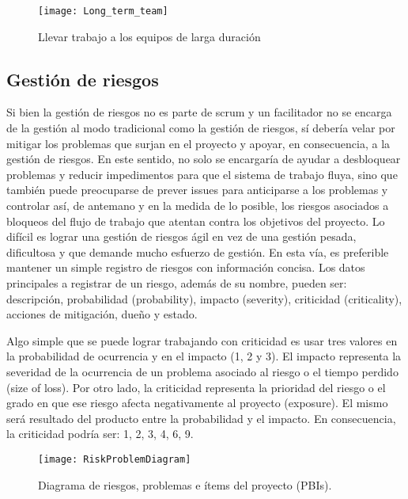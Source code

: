 \begin{figure}[h]
  \centering
  \texttt{[image: Long\_term\_team]}
  \caption{Llevar trabajo a los equipos de larga duración}
  \centering
  \label{fig:Long_term_team} %
\end{figure}
\FloatBarrier %

\subsection{Gestión de riesgos}

Si bien la gestión de riesgos no es parte de scrum y un facilitador no se encarga de la gestión al modo tradicional como la gestión de riesgos, sí debería velar por mitigar los problemas que surjan en el proyecto y apoyar, en consecuencia, a la gestión de riesgos. En este sentido, no solo se encargaría de ayudar a desbloquear problemas y reducir impedimentos para que el sistema de trabajo fluya, sino que también puede preocuparse de prever issues para anticiparse a los problemas y controlar así, de antemano y en la medida de lo posible, los riesgos asociados a bloqueos del flujo de trabajo que atentan contra los objetivos del proyecto. Lo difícil es lograr una gestión de riesgos ágil en vez de una gestión pesada, dificultosa y que demande mucho esfuerzo de gestión. En esta vía, es preferible mantener un simple registro de riesgos con información concisa. Los datos principales a registrar de un riesgo, además de su nombre, pueden ser: descripción, probabilidad (probability), impacto (severity), criticidad (criticality), acciones de mitigación, dueño y estado.

Algo simple que se puede lograr trabajando con criticidad es usar tres valores en la probabilidad de ocurrencia y en el impacto (1, 2 y 3). El impacto representa la severidad de la ocurrencia de un problema asociado al riesgo o el tiempo perdido (size of loss). Por otro lado, la criticidad representa la prioridad del riesgo o el grado en que ese riesgo afecta negativamente al proyecto (exposure). El mismo será resultado del producto entre la probabilidad y el impacto. En consecuencia, la criticidad podría ser: 1, 2, 3, 4, 6, 9.

\begin{figure}[h]
  \centering
  \texttt{[image: RiskProblemDiagram]}
  \caption{Diagrama de riesgos, problemas e ítems del proyecto (PBIs).}
  \centering
  \label{fig:RiskProblemDiagram} %
\end{figure}
\FloatBarrier %


